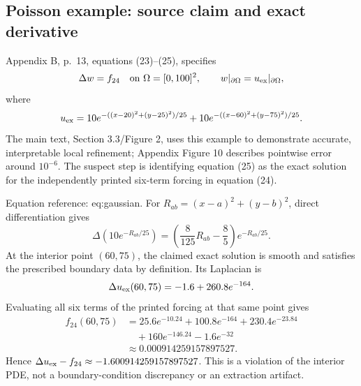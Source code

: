 \documentclass[10pt]{article}
\begin{document}
\subsection*{Poisson example: source claim and exact derivative}
Appendix B, p. 13, equations (23)–(25), specifies \[\Delta w=f_{24}\quad\hbox{on }\Omega=[0,100]^2,
 \qquad w|_{\partial\Omega}=u_{\rm ex}|_{\partial\Omega},\] where \[u_{\rm ex}=10e^{-((x-20)^2+(y-25)^2)/25}
            +10e^{-((x-60)^2+(y-75)^2)/25}.\] The main text, Section 3.3/Figure 2, uses this example to demonstrate accurate, interpretable local refinement; Appendix Figure 10 describes pointwise error around \(10^{-6}\). The suspect step is identifying equation (25) as the exact solution for the independently printed six-term forcing in equation (24).\par
Equation reference: eq:gaussian. For \(R_{ab}=(x-a)^2+(y-b)^2\), direct differentiation gives \[
 \Delta(10e^{-R_{ab}/25})
 =\left(\frac8{125}R_{ab}-\frac85\right)e^{-R_{ab}/25}.\] At the interior point \((60,75)\), the claimed exact solution is smooth and satisfies the prescribed boundary data by definition. Its Laplacian is \[\Delta u_{\rm ex}(60,75)=-1.6+260.8e^{-164}.\] Evaluating all six terms of the printed forcing at that same point gives \[\begin{aligned}
 f_{24}(60,75)
 &=25.6e^{-10.24}+100.8e^{-164}+230.4e^{-23.84}\\
 &\quad+160e^{-146.24}-1.6e^{-32}\\
 &\approx0.000914259157897527.\end{aligned}\] Hence \(\Delta u_{\rm ex}-f_{24}\approx-1.600914259157897527\). This is a violation of the interior PDE, not a boundary-condition discrepancy or an extraction artifact.\par
\end{document}
